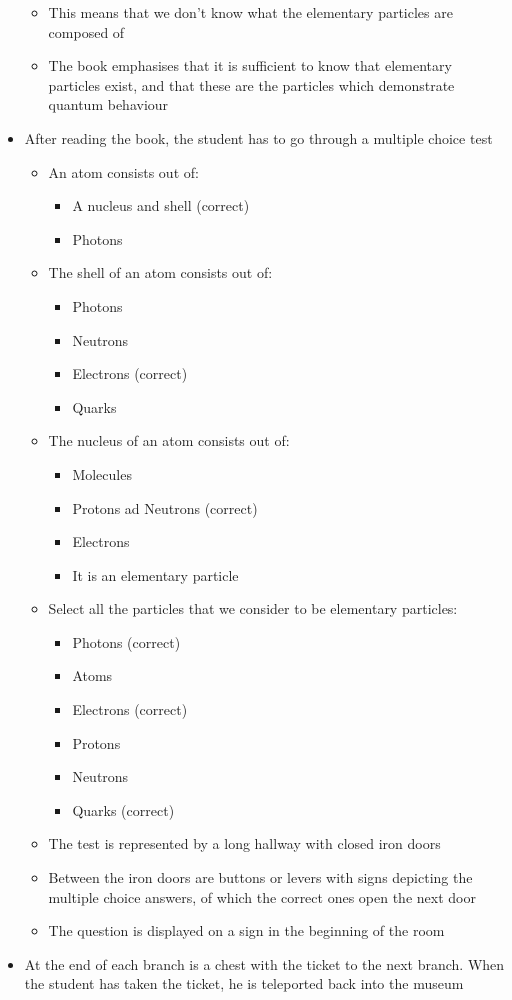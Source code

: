 \documentclass[11pt,twoside]{report} %
\begin{document}
\begin{itemize}
\begin{itemize}
		\item This means that we don’t know what the elementary particles are composed of
		\item The book emphasises that it is sufficient to know that elementary particles exist, and that these are the particles which demonstrate quantum behaviour
	\end{itemize}
	\item After reading the book, the student has to go through a multiple choice test
	\begin{itemize}
		\item An atom consists out of:
		\begin{itemize}
			\item A nucleus and shell (correct)
			\item Photons
		\end{itemize}
		\item The shell of an atom consists out of:
		\begin{itemize}
			\item Photons
			\item Neutrons
			\item Electrons (correct)
			\item Quarks
		\end{itemize}
		\item The nucleus of an atom consists out of:
		\begin{itemize}
			\item Molecules
			\item Protons ad Neutrons (correct)
			\item Electrons
			\item It is an elementary particle
		\end{itemize}
		\item Select all the particles that we consider to be elementary particles:
		\begin{itemize}
			\item Photons (correct)
			\item Atoms
			\item Electrons (correct)
			\item Protons
			\item Neutrons
			\item Quarks (correct)
		\end{itemize}
		\item The test is represented by a long hallway with closed iron doors
		\item Between the iron doors are buttons or levers with signs depicting the multiple choice answers, of which the correct ones open the next door
		\item The question is displayed on a sign in the beginning of the room
	\end{itemize}
	\item At the end of each branch is a chest with the ticket to the next branch. When the student has taken the ticket, he is teleported back into the museum
\end{itemize}
\end{document}
